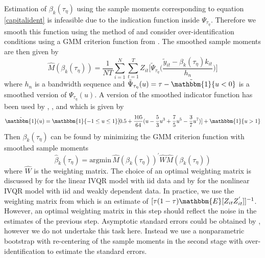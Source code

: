 \documentclass[11pt]{article}
\begin{document}
Estimation of $\beta_{k}(\tau_{\eta})$ using the sample moments corresponding to equation \eqref{capitalident} is infeasible due to the indication function inside $\Psi_{\tau_{\eta}}$. Therefore we smooth this function using the method of \cite{Kaplan2016} and consider over-identification conditions using a GMM criterion function from \cite{qgmm}. The smoothed sample moments are then given by
\begin{equation}
\hat{M}(\beta_{k}(\tau_{\eta}))=\frac{1}{NT}\sum_{i=1}^{N}\sum_{t=1}^{T}Z_{it}\Bigg[\tilde{\Psi}_{\tau_{\eta}}\Bigg(\frac{\tilde{y}_{it}-\beta_{k}(\tau_{\eta})k_{it}}{h_{n}}\Bigg)\Bigg]
\end{equation}
where $h_{n}$ is a bandwidth sequence and $\tilde{\Psi}_{\tau_{\eta}}(u)=\tau-\tilde{\mathbbm{1}}\{u<0\}$ is a smoothed version of $\Psi_{\tau_{\eta}}(u)$. A version of the smoothed indicator function has been used by \cite{Horowitz1998}, \cite{Whang2006}, and \cite{Kaplan2016} which is given by
\begin{equation*}
\tilde{\mathbbm{1}}(u)=\mathbbm{1}\{-1\leq u\leq 1\}[0.5+\frac{105}{64}(u-\frac{5}{3}u^{3}+\frac{7}{5}u^{5}-\frac{3}{7}u^{7})]+\mathbbm{1}\{u>1\}
\end{equation*}
Then $\beta_{k}(\tau_{\eta})$ can be found by minimizing the GMM criterion function with smoothed sample moments
\begin{equation*}
\hat{\beta}_{k}(\tau_{\eta})=\text{argmin}\, \hat{M}(\beta_{k}(\tau_{\eta}))^{'}\hat{W}\hat{M}(\beta_{k}(\tau_{\eta}))
\end{equation*}
where $\hat{W}$ is the weighting matrix. The choice of an optimal weighting matrix is discussed by \cite{Kaplan2016} for the linear IVQR model with iid data and by \cite{qgmm} for the nonlinear IVQR model with iid and weakly dependent data. In practice, we use the weighting matrix from \cite{Kaplan2016} which is an estimate of $[\tau(1-\tau)\mathbbm{E}[Z_{it}Z^{'}_{it}]]^{-1}$. However, an optimal weighting matrix in this step should reflect the noise in the estimates of the previous step. Asymptotic standard errors could be obtained by \cite{Ackerberg2014}, however we do not undertake this task here. Instead we use a nonparametric bootstrap with re-centering of the sample moments in the second stage with over-identification to estimate the standard errors. 
\end{document}

